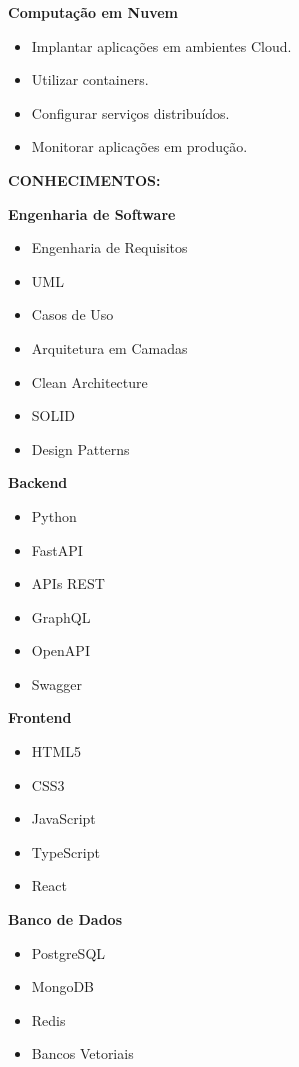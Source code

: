 \textbf{Computação em Nuvem}

\begin{itemize}
\item Implantar aplicações em ambientes Cloud.
\item Utilizar containers.
\item Configurar serviços distribuídos.
\item Monitorar aplicações em produção.
\end{itemize}

\textbf{CONHECIMENTOS:}

\textbf{Engenharia de Software}

\begin{itemize}
\item Engenharia de Requisitos
\item UML
\item Casos de Uso
\item Arquitetura em Camadas
\item Clean Architecture
\item SOLID
\item Design Patterns
\end{itemize}

\textbf{Backend}

\begin{itemize}
\item Python
\item FastAPI
\item APIs REST
\item GraphQL
\item OpenAPI
\item Swagger
\end{itemize}

\textbf{Frontend}

\begin{itemize}
\item HTML5
\item CSS3
\item JavaScript
\item TypeScript
\item React
\end{itemize}

\textbf{Banco de Dados}

\begin{itemize}
\item PostgreSQL
\item MongoDB
\item Redis
\item Bancos Vetoriais
\end{itemize}

